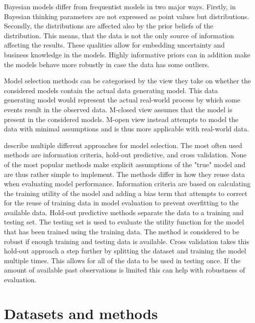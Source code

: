 \documentclass[english, 12pt, a4paper, sci, utf8, a-1b, online]{aaltothesis}
\begin{document}
\begin{abstractpage}[english]
Bayesian models differ from frequentist models in two major ways. Firstly, in Bayesian thinking parameters are not expressed as point values but distributions. Secondly, the distributions are affected also by the prior beliefs of the distribution. This means, that the data is not the only source of information affecting the results. These qualities allow for embedding uncertainty and business knowledge in the models. Highly informative priors can in addition make the models behave more robustly in case the data has some outliers. 

Model selection methods can be categorised by the view they take on whether the considered models contain the actual data generating model. This data generating model would represent the actual real-world process by which some events result in the observed data. M-closed view assumes that the model is present in the considered models. M-open view instead attempts to model the data with minimal assumptions and is thus more applicable with real-world data. 

\cite{vehtari2012} describe multiple different approaches for model selection. The most often used methods are information criteria, hold-out predictive, and cross validation. None of the most popular methods make explicit assumptions of the "true" model and are thus rather simple to implement. The methods differ in how they reuse data when evaluating model performance. Information criteria are based on calculating the training utility of the model and adding a bias term that attempts to correct for the reuse of training data in model evaluation to prevent overfitting to the available data. Hold-out predictive methods separate the data to a training and testing set. The testing set is used to evaluate the utility function for the model that has been trained using the training data. The method is considered to be robust if enough training and testing data is available. Cross validation takes this hold-out approach a step further by splitting the dataset and training the model multiple times. This allows for all of the data to be used in testing once. If the amount of available past observations is limited this can help with robustness of evaluation.


\section{Datasets and methods}


\end{abstractpage}
\end{document}
